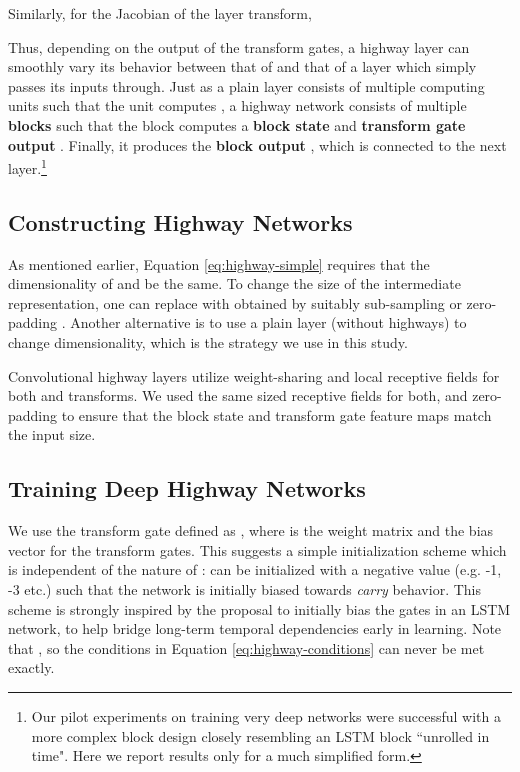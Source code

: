 \documentclass{article}
\begin{document}
Similarly, for the Jacobian of the layer transform,



Thus, depending on the output of the transform gates, a highway layer can smoothly vary its behavior between that of  and that of a layer which simply passes its inputs through. Just as a plain layer consists of multiple computing units such that the  unit computes , a highway network consists of multiple \textbf{blocks} such that the  block computes a \textbf{block state}  and \textbf{transform gate output} . Finally, it produces the \textbf{block output} , which is connected to the next layer.\footnote{Our pilot experiments on training very deep networks were successful with a more complex block design closely resembling an LSTM block ``unrolled in time". Here we report results only for a much simplified form.}

\subsection{Constructing Highway Networks}

As mentioned earlier, Equation \ref{eq:highway-simple} requires that the dimensionality of  and  be the same. To change the size of the intermediate representation, one can replace  with  obtained by suitably sub-sampling or zero-padding . Another alternative is to use a plain layer (without highways) to change dimensionality, which is the strategy we use in this study.

Convolutional highway layers utilize weight-sharing and local receptive fields for both  and  transforms. We used the same sized receptive fields for both, and zero-padding to ensure that the block state and transform gate feature maps match the input size.

\subsection{Training Deep Highway Networks}



We use the transform gate defined as , where  is the weight matrix and  the bias vector for the transform gates. This suggests a simple initialization scheme which is independent of the nature of :  can be initialized with a negative value (e.g. -1, -3 etc.) such that the network is initially biased towards \emph{carry} behavior. This scheme is strongly inspired by the proposal \cite{Gers1999} to initially bias the gates in an LSTM network, to help bridge long-term temporal dependencies early in learning. Note that , so the conditions in Equation \ref{eq:highway-conditions} can never be met exactly. 
\end{document}
